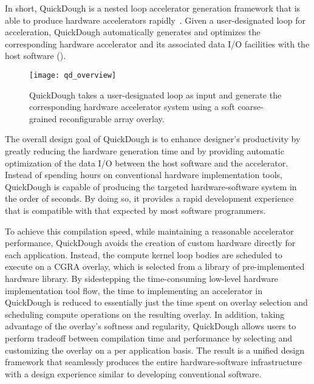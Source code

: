 In short, QuickDough is a nested loop accelerator generation framework that is able to produce hardware accelerators rapidly~\cite{Lin:2012:EDC:2460216.2460227,Liu:2015:FSP}.
Given a user-designated loop for acceleration, QuickDough automatically generates and optimizes the corresponding hardware accelerator and its associated data I/O facilities with the host software ().



\begin{figure}
\centering
\texttt{[image: qd\_overview]}
\caption{QuickDough takes a user-designated loop as input and generate the corresponding hardware accelerator system using a soft coarse-grained reconfigurable array overlay.}
\label{fig:qd_overview}
\end{figure}

The overall design goal of QuickDough is to enhance designer's productivity by greatly reducing the hardware generation time and by providing automatic optimization of the data I/O between the host software and the accelerator.
Instead of spending hours on conventional hardware implementation tools, QuickDough is capable of producing the targeted hardware-software system in the order of seconds.
By doing so, it provides a rapid development experience that is compatible with that expected by most software programmers.

To achieve this compilation speed, while maintaining a reasonable accelerator performance, QuickDough avoids the creation of custom hardware directly for each application.
Instead, the compute kernel loop bodies are scheduled to execute on a CGRA overlay, which is selected from a library of pre-implemented hardware library.
By sidestepping the time-consuming low-level hardware implementation tool flow, the time to implementing an accelerator in QuickDough is reduced to essentially just the time spent on overlay selection and scheduling compute operations on the resulting overlay.
In addition, taking advantage of the overlay's softness and regularity, QuickDough allows users to perform tradeoff between compilation time and performance by selecting and customizing the overlay on a per application basis.  The result is a unified design framework that seamlessly produces the entire hardware-software infrastructure with a design experience similar to developing conventional software.

